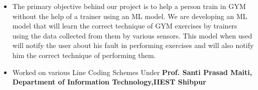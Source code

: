 \documentclass[10pt,a4paper,ragged2e]{altacv}
\begin{document}
\begin{itemize}
\item The primary objective behind our project is to help a person train in GYM without the help of a trainer using an ML model. We are developing an ML model that will learn the correct technique of GYM exercises by trainers using the data collected from them by various sensors. This model when used will notify the user about his fault in performing exercises and will also notify him the correct technique of performing them.
\end{itemize}
\smallskip
{}
\begin{itemize}
\item Worked on various Line Coding Schemes Under \textbf{Prof. Santi Prasad Maiti, Department of Information Technology,IIEST Shibpur}
\end{itemize}



\divider

\divider






\clearpage
\nocite{*}
\end{document}
